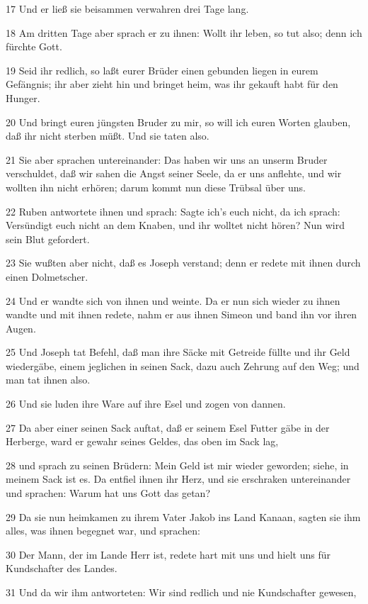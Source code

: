 \par 17 Und er ließ sie beisammen verwahren drei Tage lang.
\par 18 Am dritten Tage aber sprach er zu ihnen: Wollt ihr leben, so tut also; denn ich fürchte Gott.
\par 19 Seid ihr redlich, so laßt eurer Brüder einen gebunden liegen in eurem Gefängnis; ihr aber zieht hin und bringet heim, was ihr gekauft habt für den Hunger.
\par 20 Und bringt euren jüngsten Bruder zu mir, so will ich euren Worten glauben, daß ihr nicht sterben müßt. Und sie taten also.
\par 21 Sie aber sprachen untereinander: Das haben wir uns an unserm Bruder verschuldet, daß wir sahen die Angst seiner Seele, da er uns anflehte, und wir wollten ihn nicht erhören; darum kommt nun diese Trübsal über uns.
\par 22 Ruben antwortete ihnen und sprach: Sagte ich's euch nicht, da ich sprach: Versündigt euch nicht an dem Knaben, und ihr wolltet nicht hören? Nun wird sein Blut gefordert.
\par 23 Sie wußten aber nicht, daß es Joseph verstand; denn er redete mit ihnen durch einen Dolmetscher.
\par 24 Und er wandte sich von ihnen und weinte. Da er nun sich wieder zu ihnen wandte und mit ihnen redete, nahm er aus ihnen Simeon und band ihn vor ihren Augen.
\par 25 Und Joseph tat Befehl, daß man ihre Säcke mit Getreide füllte und ihr Geld wiedergäbe, einem jeglichen in seinen Sack, dazu auch Zehrung auf den Weg; und man tat ihnen also.
\par 26 Und sie luden ihre Ware auf ihre Esel und zogen von dannen.
\par 27 Da aber einer seinen Sack auftat, daß er seinem Esel Futter gäbe in der Herberge, ward er gewahr seines Geldes, das oben im Sack lag,
\par 28 und sprach zu seinen Brüdern: Mein Geld ist mir wieder geworden; siehe, in meinem Sack ist es. Da entfiel ihnen ihr Herz, und sie erschraken untereinander und sprachen: Warum hat uns Gott das getan?
\par 29 Da sie nun heimkamen zu ihrem Vater Jakob ins Land Kanaan, sagten sie ihm alles, was ihnen begegnet war, und sprachen:
\par 30 Der Mann, der im Lande Herr ist, redete hart mit uns und hielt uns für Kundschafter des Landes.
\par 31 Und da wir ihm antworteten: Wir sind redlich und nie Kundschafter gewesen,
